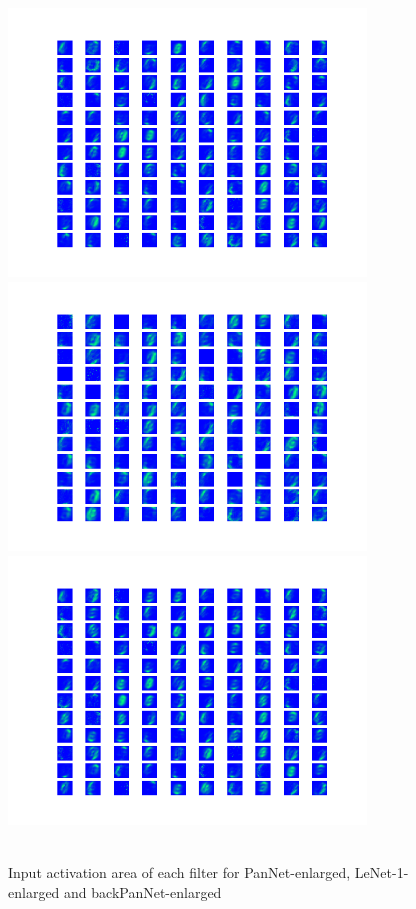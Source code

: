 \begin{figure}[th]
\centering
\includegraphics[width=95mm]{Figures/PanNet-enlarged}
\includegraphics[width=95mm]{Figures/LeNet-enlarged}
\includegraphics[width=95mm]{Figures/backPanNet-enlarged}
\decoRule
\caption{\\Input activation area of each filter for PanNet-enlarged, LeNet-1-enlarged and backPanNet-enlarged}
\label{fig:filters_enlarged}
\end{figure}



